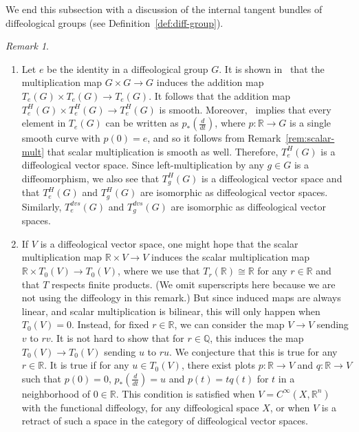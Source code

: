 \documentclass{amsart}
\theoremstyle{remark}
\newtheorem{rem}[de]{Remark}
\newcommand{\ra}{\to}
\newcommand{\ddt}{{\textstyle\frac{d}{dt}}}
\def \Q{\mathbb{Q}}
\def \R{\mathbb{R}}
\begin{document}
We end this subsection with a discussion of the internal tangent bundles of diffeological groups
(see Definition~\ref{def:diff-group}).

\begin{rem}\label{rem:diff-group}\
\begin{enumerate}
\item Let $e$ be the identity in a diffeological group $G$.
It is shown in~\cite[Proposition~6.4]{HM} that the multiplication map $G \times G \ra G$
induces the addition map $T_e(G) \times T_e(G) \ra T_e(G)$.
It follows that the addition map
$T_e^H(G) \times T_e^H(G) \ra T_e^H(G)$ is smooth.
Moreover,~\cite[Corollary~6.5]{HM} implies that every element in $T_e(G)$
can be written as $p_*(\frac{d}{dt})$, where $p:\R \ra G$ is a single smooth curve with $p(0)=e$,
and so it follows from Remark~\ref{rem:scalar-mult} that scalar multiplication is smooth as well.
Therefore, $T_e^H(G)$ is a diffeological vector space.
Since left-multiplication by any $g \in G$ is a diffeomorphism,
we also see that $T_g^H(G)$ is a diffeological vector space
and that $T_e^H(G)$ and $T_g^H(G)$ are isomorphic as diffeological vector spaces.
Similarly, $T_e^{dvs}(G)$ and $T_g^{dvs}(G)$ are isomorphic as diffeological vector spaces.

%
\item If $V$ is a diffeological vector space, one might hope that the
scalar multiplication map $\R \times V \to V$ induces the scalar multiplication
map $\R \times T_0(V) \to T_0(V)$, where we use that $T_r(\R) \cong \R$ for any $r \in \R$
and that $T$ respects finite products.
(We omit superscripts here because we are not using the diffeology in this remark.)
%
But since induced maps are always linear, and scalar multiplication is bilinear,
this will only happen when $T_0(V) = 0$.
Instead, for fixed $r \in \R$, we can consider the map $V \to V$ sending $v$ to $r v$.
It is not hard to show that for $r \in \Q$, this induces the map $T_0(V) \to T_0(V)$
sending $u$ to $r u$.
We conjecture that this is true for any $r \in \R$.
It is true if for any $u \in T_0(V)$, there exist plots $p: \R \to V$ and 
$q: \R \to V$ such that $p(0) = 0$, $p_*(\ddt) = u$ and $p(t) = t q(t)$ for $t$ in a neighborhood of $0 \in \R$. 
This condition is satisfied when $V = C^\infty(X, \R^n)$ with the functional diffeology, for any 
diffeological space $X$, or when $V$ is a retract of such a space in the category of diffeological vector spaces.
\end{enumerate}
\end{rem}
\end{document}
